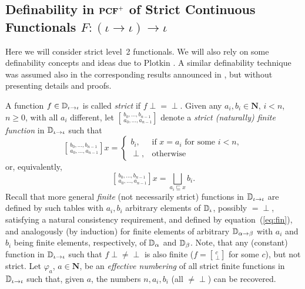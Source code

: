 \documentclass[fleqn]{LMCS}
\theoremstyle{plain}\newtheorem{satz}[thm]{Satz}
\theoremstyle{plain}\newtheorem{hyp}[thm]{Hypothesis}
\theoremstyle{plain}\newtheorem{hyps}[thm]{Hypotheses}
\theoremstyle{definition}\newtheorem{note}[thm]{Note}
\newcommand{\arr}{\rightarrow}
\newcommand{\NN}{\mathbf{N}}
\newcommand{\PCF}{\mbox{\bf PCF}}
\newcommand{\Undef}{{\perp}}
\newcommand{\?}{\mbox{?}}
\begin{document}
\subsection{Definability in \texorpdfstring{$\PCF^+$}{PCF+} 
of Strict Continuous Functionals 
\texorpdfstring{\mbox{$F:(\iota\arr\iota)\arr\iota$}}{F:(i->i)->i}}
\label{sec:strict-functionals}


\noindent
Here we will consider strict level~2 functionals. 
We will also rely on some definability concepts 
and ideas due to Plotkin \cite{Plotkin77}.  
A similar definability technique was assumed also in 
the corresponding results announced in 
\cite{Saz76d,Saz76AL}, but without 
presenting details and proofs. 

A function $f\in \bbD_{\iota\arr\iota}$ is called \emph{strict} if 
$f\Undef=\Undef$.
Given any 
$a_i,b_i\in \NN$,  
$i<n$, $n\ge 0$, with all $a_i$ different, 
let 
$	\left[\,^{b_0,\ldots,b_{n-1}}
		 _{a_0,\ldots,a_{n-1}}\right]
$
denote a \emph{strict (naturally) finite function} in $\bbD_{\iota\arr\iota}$ 
such that 
\[
		 \left[\,^{b_0,\ldots,b_{n-1}}
		 _{a_0,\ldots,a_{n-1}}\right]
		x
		=\left\{\begin{array}{cl}
		b_i,  & \mbox{if } x=a_i \mbox{ for some } i<n, \\
 		\Undef, & \mbox{otherwise}
			   \end{array}
		\right.
\]
or, equivalently, 
\begin{equation}\label{eq:fin}
		 \left[\,^{b_0,\ldots,b_{n-1}}
		 _{a_0,\ldots,a_{n-1}}\right]
		x
		=\bigsqcup_{a_i \sqsubseteq x} b_i.  
\end{equation}
Recall that more general \emph{finite} (not necessarily strict) functions 
in $\bbD_{\iota\arr\iota}$ are defined by such tables with 
$a_i,b_i$ arbitrary elements of $\mathbb{D}_{\iota}$, possibly ${}=\Undef$, 
satisfying 
a natural consistency requirement, and defined by equation~(\ref{eq:fin}), 
and analogously (by induction) for finite elements of 
arbitrary $\bbD_{\alpha\arr\beta}$ with 
$a_i$ and $b_i$ being finite elements, respectively, 
of $\mathbb{D}_{\alpha}$ and $\mathbb{D}_{\beta}$. 
Note, that any (constant) function in $\bbD_{\iota\arr\iota}$ 
such that $f\Undef\ne\Undef$ is also 
finite ($f=\left[\,_{\Undef}^{c}\right]$ for some $c$), but not strict. 
Let $\varphi_a$, $a\in \NN$, be an \emph{effective numbering} of all 
strict finite functions in $\bbD_{\iota\arr\iota}$ 
such that, given $a$, the numbers $n,a_i,b_i$ (all ${}\ne\Undef$) can be recovered. 
\end{document}

